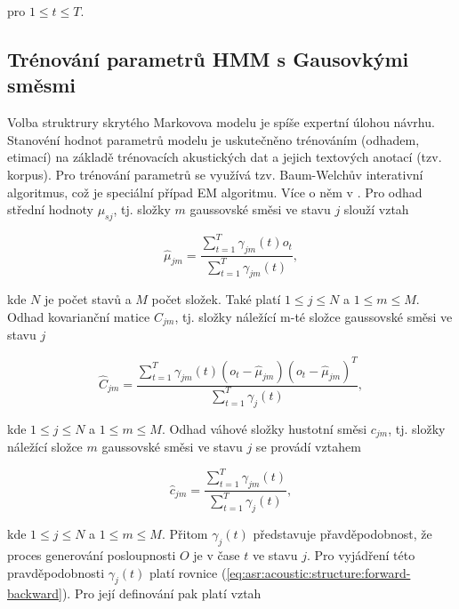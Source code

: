 \noindent pro $1 \leq t \leq T$.

\subsection{Trénování parametrů HMM s Gausovkými směsmi}
\label{chap:asr:acoustic:GMM}

Volba struktrury skrytého Markovova modelu je spíše expertní úlohou návrhu. Stanovéní hodnot parametrů modelu je uskutečněno trénováním (odhadem, etimací) na základě trénovacích akustických dat a jejich textových anotací (tzv. korpus). Pro trénování parametrů se využívá tzv. Baum-Welchův interativní algoritmus, což je speciální případ EM algoritmu. Více o něm v \cite{Holmes2001}. Pro odhad střední hodnoty $\mu_{sj}$, tj. složky $m$ gaussovské směsi ve stavu $j$ slouží vztah

\begin{equation}
  \hat{\mu}_{jm} = \frac{\sum_{t=1}^{T}\gamma_{jm}\left(t\right)o_t}{\sum_{t=1}^{T}\gamma_{jm}\left(t\right)},
  \label{eq:asr:acoustic:structure:mu}
\end{equation}

\noindent kde $N$ je počet stavů a $M$ počet složek. Také platí $1 \leq j \leq N$ a $1 \leq m \leq M$. Odhad kovarianční matice $C_{jm}$, tj. složky náležící m-té složce gaussovské směsi ve stavu $j$

\begin{equation}
  \hat{C}_{jm} = \frac{\sum_{t=1}^{T} \gamma_{jm}\left(t\right)\left(o_t - \hat{\mu}_{jm}\right)\left(o_t - \hat{\mu}_{jm}\right)^{T}}{\sum_{t=1}^{T}\gamma_j\left(t\right)},
  \label{eq:asr:acoustic:structure:covariant}
\end{equation}

\noindent kde $1 \leq j \leq N$ a $1 \leq m \leq M$. Odhad váhové složky hustotní směsi $c_{jm}$, tj. složky náležící složce $m$ gaussovské směsi ve stavu $j$ se provádí vztahem

\begin{equation}
  \hat{c}_{jm} = \frac{\sum_{t=1}^{T} \gamma_{jm}\left(t\right)}{\sum_{t=1}^{T}\gamma_j\left(t\right)},
  \label{eq:asr:acoustic:structure:weight}
\end{equation}

\noindent kde $1 \leq j \leq N$ a $1 \leq m \leq M$. Přitom $\gamma_{j}\left(t\right)$ představuje přavděpodobnost, že proces generování posloupnosti $O$ je v čase $t$ ve stavu $j$. Pro vyjádření této pravděpodobnosti $\gamma_{j}\left(t\right)$ platí rovnice (\ref{eq:asr:acoustic:structure:forward-backward}). Pro její definování pak platí vztah

